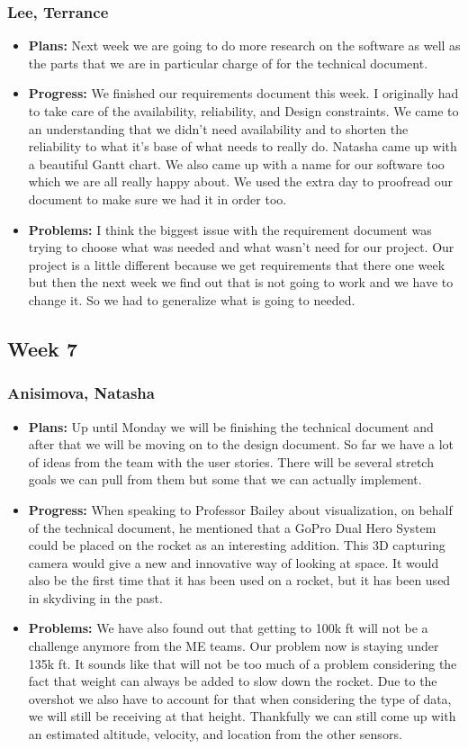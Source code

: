 \documentclass[10pt,draftclsnofoot,onecolumn]{IEEEtran}
\begin{document}
\subsubsection{Lee, Terrance}
\begin{itemize}
	\item \textbf{Plans: }Next week we are going to do more research on the software as well as the parts that we are in particular charge of for the technical document.
	\item \textbf{Progress: }We finished our requirements document this week. I originally had to take care of the availability, reliability, and Design constraints. We came to an understanding that we didn’t need availability and to shorten the reliability to what it’s base of what needs to really do. Natasha came up with a beautiful Gantt chart. We also came up with a name for our software too which we are all really happy about. We used the extra day to proofread our document to make sure we had it in order too.
	\item \textbf{Problems: }I think the biggest issue with the requirement document was trying to choose what was needed and what wasn’t need for our project. Our project is a little different because we get requirements that there one week but then the next week we find out that is not going to work and we have to change it. So we had to generalize what is going to needed.
\end{itemize}
\subsection{Week 7}
\subsubsection{Anisimova, Natasha}
\begin{itemize}
	\item \textbf{Plans: }
	Up until Monday we will be finishing the technical document and after that we will be moving on to the design document. So far we have a lot of ideas from the team with the user stories. There will be several stretch goals we can pull from them but some that we can actually implement.
	\item \textbf{Progress: }
	When speaking to Professor Bailey about visualization, on behalf of the technical document, he mentioned that a GoPro Dual Hero System could be placed on the rocket as an interesting addition. This 3D capturing camera would give a new and innovative way of looking at space. It would also be the first time that it has been used on a rocket, but it has been used in skydiving in the past.
	\item \textbf{Problems: }
	We have also found out that getting to 100k ft will not be a challenge anymore from the ME teams. Our problem now is staying under 135k ft. It sounds like that will not be too much of a problem considering the fact that weight can always be added to slow down the rocket. Due to the overshot we also have to account for that when considering the type of data, we will still be receiving at that height. Thankfully we can still come up with an estimated altitude, velocity, and location from the other sensors.
\end{itemize}
\end{document}
